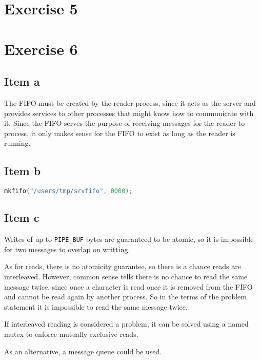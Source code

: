 {\section{Exercise 5}


\section{Exercise 6}
\subsection{Item a}
The FIFO must be created by the reader process, since it acts as the server and provides services to other processes that might know how to communicate with it. Since the FIFO serves the purpose of receiving messages for the reader to process, it only makes sense for the FIFO to exist as long as the reader is running.

\subsection{Item b}
\begin{lstlisting}[language=C]
mkfifo("/users/tmp/srvfifo", 0000);
\end{lstlisting}

\subsection{Item c}
Writes of up to \texttt{PIPE\_BUF} bytes are guaranteed to be atomic, so it is impossible for two messages to overlap on writting.\par
As for reads, there is no atomicity guarantee, so there is a chance reads are interleaved. However, common sense tells there is no chance to read the same message twice, since once a character is read once it is removed from the FIFO and cannot be read again by another process. So in the terms of the problem statement it is impossible to read the same message twice.\par
If interleaved reading is considered a problem, it can be solved using a named mutex to enforce mutually exclusive reads.\par
As an alternative, a message queue could be used.

}
